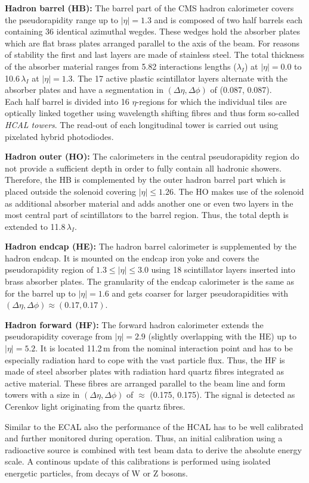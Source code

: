 \begin{description}
 \item \textbf{Hadron barrel (HB):} The barrel part of the CMS hadron calorimeter covers the pseudorapidity range up to $|\eta| = 1.3$ and is composed of two half barrels each containing 36 identical azimuthal wegdes. These wedges hold the absorber plates which are flat brass plates arranged parallel to the axis of the beam. For reasons of stability the first and last layers are made of stainless steel. The total thickness of the absorber material ranges from 5.82 interactions lengths ($\lambda_I$) at $|\eta| = 0.0$ to 10.6\,$\lambda_I$ at $|\eta| = 1.3$. The 17 active plastic scintillator layers alternate with the absorber plates and have a segmentation in $(\Delta \eta, \Delta \phi)$ of (0.087, 0.087).\\
Each half barrel is divided into 16 $\eta$-regions for which the individual tiles are optically linked together using wavelength shifting fibres and thus form so-called \textit{HCAL towers}. The read-out of each longitudinal tower is carried out using pixelated hybrid photodiodes.
 \item \textbf{Hadron outer (HO):} The calorimeters in the central pseudorapidity region do not provide a sufficient depth in order to fully contain all hadronic showers. Therefore, the HB is complemented by the outer hadron barrel part which is placed outside the solenoid covering $|\eta| \le 1.26$. The HO makes use of the solenoid as additional absorber material and adds another one or even two layers in the most central part of scintillators to the barrel region. Thus, the total depth is extended to 11.8\,$\lambda_I$.
 \item \textbf{Hadron endcap (HE):} The hadron barrel calorimeter is supplemented by the hadron endcap. It is mounted on the endcap iron yoke and covers the pseudorapidity region of $1.3 \le |\eta| \le 3.0$ using 18 scintillator layers inserted into brass absorber plates. The granularity of the endcap calorimeter is the same as for the barrel up to $|\eta| = 1.6$ and gets coarser for larger pseudorapidities with $(\Delta \eta, \Delta \phi) \approx (0.17, 0.17)$.
 \item \textbf{Hadron forward (HF):} The forward hadron calorimeter extends the pseudorapidity coverage from $|\eta| = 2.9$ (slightly overlapping with the HE) up to $|\eta| = 5.2$. It is located 11.2\,m from the nominal interaction point and has to be especially radiation hard to cope with the vast particle flux. Thus, the HF is made of steel absorber plates with radiation hard quartz fibres integrated as active material. These fibres are arranged parallel to the beam line and form towers with a size in $(\Delta \eta, \Delta \phi)$ of $\approx$ (0.175, 0.175). The signal is detected as Cerenkov light originating from the quartz fibres.
\end{description}
Similar to the ECAL also the performance of the HCAL has to be well calibrated and further monitored during operation. Thus, an initial calibration using a radioactive source is combined with test beam data to derive the absolute energy scale. A continous update of this calibrations is performed using isolated energetic particles, \eg from decays of W or Z bosons. 

